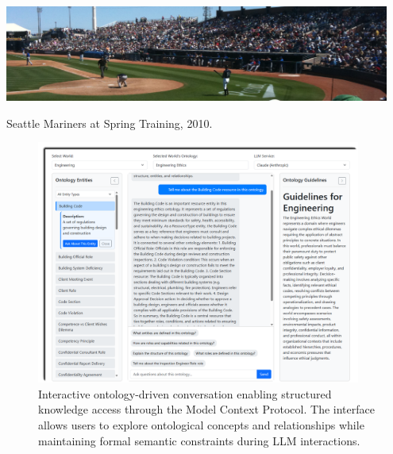 \documentclass[sigconf,anonymous]{acmart}
\begin{document}


\begin{teaserfigure}
  \includegraphics[width=0.95\textwidth]{sampleteaser}
  \caption{Seattle Mariners at Spring Training, 2010.}
  \label{fig:teaser}
\end{teaserfigure}

\maketitle
\clearpage

\begin{figure}[htp]
  \centering
  \includegraphics[width=0.95\textwidth]{images/ontology_chat.png}
  \caption{Interactive ontology-driven conversation enabling structured knowledge access through the Model Context Protocol. The interface allows users to explore ontological concepts and relationships while maintaining formal semantic constraints during LLM interactions.}
  \label{fig:ontology_chat}
\end{figure}



%
%
\end{document}
